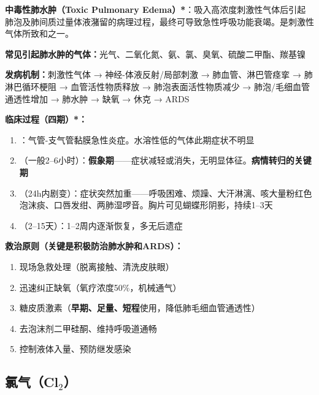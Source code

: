 \begin{keybox}
\textbf{中毒性肺水肿（Toxic Pulmonary Edema）*}：吸入高浓度刺激性气体后引起肺泡及肺间质过量体液潴留的病理过程，最终可导致急性呼吸功能衰竭。是刺激性气体所致和之一。

\textbf{常见引起肺水肿的气体：}光气、二氧化氮、氨、氯、臭氧、硫酸二甲酯、羰基镍

\textbf{发病机制：}刺激性气体 → 神经-体液反射/局部刺激 → 肺血管、淋巴管痉挛 → 肺淋巴循环梗阻 → 血管活性物质释放 → 肺泡表面活性物质减少 → 肺泡/毛细血管通透性增加 → 肺水肿 → 缺氧 → 休克 → ARDS

\textbf{临床过程（四期）*：}
\begin{enumerate}[leftmargin=*]
    \item {}：气管-支气管黏膜急性炎症。水溶性低的气体此期症状不明显
    \item {}（一般2--6小时）：\textbf{假象期}——症状减轻或消失，无明显体征。\textbf{病情转归的关键期}
    \item {}（24h内剧变）：症状突然加重——呼吸困难、烦躁、大汗淋漓、咳大量粉红色泡沫痰、口唇发绀、两肺湿啰音。胸片可见蝴蝶形阴影，持续1--3天
    \item {}（2--15天）：1--2周内逐渐恢复，多无后遗症
\end{enumerate}

\textbf{救治原则（关键是积极防治肺水肿和ARDS）：}
\begin{enumerate}[leftmargin=*]
    \item 现场急救处理（脱离接触、清洗皮肤眼）
    \item 迅速纠正缺氧（氧疗浓度50\%，机械通气）
    \item 糖皮质激素（\textbf{早期、足量、短程}使用，降低肺毛细血管通透性）
    \item 去泡沫剂二甲硅酮、维持呼吸道通畅
    \item 控制液体入量、预防继发感染
\end{enumerate}
\end{keybox}

\subsection{氯气（Cl$_2$）}

